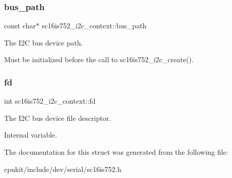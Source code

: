 \subsubsection{\texorpdfstring{bus\_path}{bus\_path}}
{\footnotesize\ttfamily const char$\ast$ sc16is752\+\_\+i2c\+\_\+context\+::bus\+\_\+path}



The I2C bus device path. 

Must be initialized before the call to sc16is752\+\_\+i2c\+\_\+create(). \mbox{\label{structsc16is752__i2c__context_ae8a161c476233aef6f31295df2786d0c}} 
\subsubsection{\texorpdfstring{fd}{fd}}
{\footnotesize\ttfamily int sc16is752\+\_\+i2c\+\_\+context\+::fd}



The I2C bus device file descriptor. 

Internal variable. 

The documentation for this struct was generated from the following file\+:\begin{DoxyCompactItemize}
\item 
cpukit/include/dev/serial/sc16is752.\+h\end{DoxyCompactItemize}
